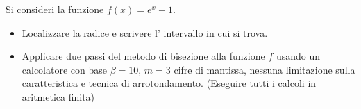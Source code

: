 Si consideri la funzione $f(x)=e^x-1$.
\begin{itemize}
\item  Localizzare la radice e
scrivere l' intervallo in cui si trova.
\item Applicare due passi del
metodo di bisezione alla funzione $f$ usando un calcolatore con
base $\beta =10$, $m=3$ cifre di mantissa, nessuna limitazione
sulla caratteristica e tecnica di arrotondamento. (Eseguire tutti
i calcoli in aritmetica finita)
\end{itemize}
